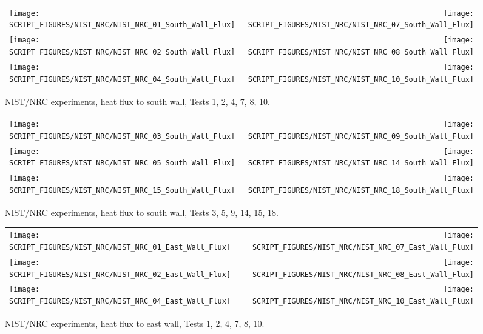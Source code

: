 \begin{figure}[p]
\begin{tabular*}{\textwidth}{l@{\extracolsep{\fill}}r}
\texttt{[image: SCRIPT\_FIGURES/NIST\_NRC/NIST\_NRC\_01\_South\_Wall\_Flux]} &
\texttt{[image: SCRIPT\_FIGURES/NIST\_NRC/NIST\_NRC\_07\_South\_Wall\_Flux]} \\
\texttt{[image: SCRIPT\_FIGURES/NIST\_NRC/NIST\_NRC\_02\_South\_Wall\_Flux]} &
\texttt{[image: SCRIPT\_FIGURES/NIST\_NRC/NIST\_NRC\_08\_South\_Wall\_Flux]} \\
\texttt{[image: SCRIPT\_FIGURES/NIST\_NRC/NIST\_NRC\_04\_South\_Wall\_Flux]} &
\texttt{[image: SCRIPT\_FIGURES/NIST\_NRC/NIST\_NRC\_10\_South\_Wall\_Flux]}
\end{tabular*}
\caption[NIST/NRC experiments, heat flux to south wall, Tests 1, 2, 4, 7, 8, 10]{NIST/NRC experiments, heat flux to south wall, Tests 1, 2, 4, 7, 8, 10.}
\label{NIST_NRC_South_Wall_Flux_Closed}
\end{figure}

\begin{figure}[p]
\begin{tabular*}{\textwidth}{l@{\extracolsep{\fill}}r}
\texttt{[image: SCRIPT\_FIGURES/NIST\_NRC/NIST\_NRC\_03\_South\_Wall\_Flux]} &
\texttt{[image: SCRIPT\_FIGURES/NIST\_NRC/NIST\_NRC\_09\_South\_Wall\_Flux]} \\
\texttt{[image: SCRIPT\_FIGURES/NIST\_NRC/NIST\_NRC\_05\_South\_Wall\_Flux]} &
\texttt{[image: SCRIPT\_FIGURES/NIST\_NRC/NIST\_NRC\_14\_South\_Wall\_Flux]} \\
\texttt{[image: SCRIPT\_FIGURES/NIST\_NRC/NIST\_NRC\_15\_South\_Wall\_Flux]} &
\texttt{[image: SCRIPT\_FIGURES/NIST\_NRC/NIST\_NRC\_18\_South\_Wall\_Flux]}
\end{tabular*}
\caption[NIST/NRC experiments, heat flux to south wall, Tests 3, 5, 9, 14, 15, 18]{NIST/NRC experiments, heat flux to south wall, Tests 3, 5, 9, 14, 15, 18.}
\label{NIST_NRC_South_Wall_Flux_Open}
\end{figure}


\begin{figure}[p]
\begin{tabular*}{\textwidth}{l@{\extracolsep{\fill}}r}
\texttt{[image: SCRIPT\_FIGURES/NIST\_NRC/NIST\_NRC\_01\_East\_Wall\_Flux]} &
\texttt{[image: SCRIPT\_FIGURES/NIST\_NRC/NIST\_NRC\_07\_East\_Wall\_Flux]} \\
\texttt{[image: SCRIPT\_FIGURES/NIST\_NRC/NIST\_NRC\_02\_East\_Wall\_Flux]} &
\texttt{[image: SCRIPT\_FIGURES/NIST\_NRC/NIST\_NRC\_08\_East\_Wall\_Flux]} \\
\texttt{[image: SCRIPT\_FIGURES/NIST\_NRC/NIST\_NRC\_04\_East\_Wall\_Flux]} &
\texttt{[image: SCRIPT\_FIGURES/NIST\_NRC/NIST\_NRC\_10\_East\_Wall\_Flux]}
\end{tabular*}
\caption[NIST/NRC experiments, heat flux to east wall, Tests 1, 2, 4, 7, 8, 10]{NIST/NRC experiments, heat flux to east wall, Tests 1, 2, 4, 7, 8, 10.}
\label{NIST_NRC_East_Wall_Flux_Closed}
\end{figure}

